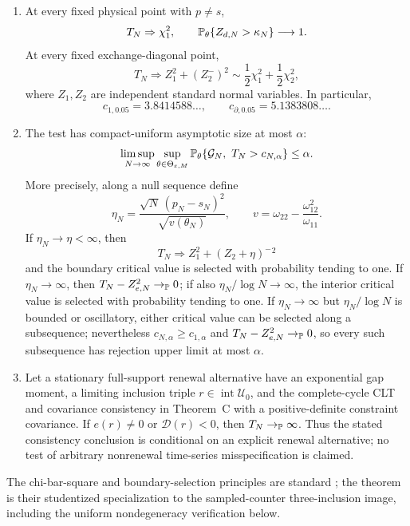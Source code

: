 \begin{theorem}
\begin{enumerate}[label=\textup{(\roman*)}]
\item At every fixed physical point with \(p\ne s\),
\[
T_N\Rightarrow\chi_1^2,
\qquad
\mathbb{P}_\theta\{Z_{d,N}>\kappa_N\}\longrightarrow1.
\]
At every fixed exchange-diagonal point,
\[
T_N\Rightarrow Z_1^2+(Z_2^-)^2
\sim\frac12\chi_1^2+\frac12\chi_2^2,
\]
where \(Z_1,Z_2\) are independent standard normal variables.  In particular,
\[
c_{1,0.05}=3.8414588\ldots,\qquad
c_{\partial,0.05}=5.1383808\ldots .
\]

\item The test has compact-uniform asymptotic size at most \(\alpha\):
\[
\limsup_{N\to\infty}
\sup_{\theta\in\Theta_{\varepsilon,M}}
\mathbb{P}_\theta\{\mathcal G_N,\ T_N>c_{N,\alpha}\}
\le\alpha.
\]
More precisely, along a null sequence define
\[
\eta_N=
\frac{\sqrt N\,(p_N-s_N)^2}
{\sqrt{v(\theta_N)}},
\qquad
v=\omega_{22}-\frac{\omega_{12}^2}{\omega_{11}}.
\]
If \(\eta_N\to\eta<\infty\), then
\[
T_N\Rightarrow Z_1^2+(Z_2+\eta)^-{}^2
\]
and the boundary critical value is selected with probability tending to one.
If \(\eta_N\to\infty\), then
\(T_N-Z_{e,N}^2\to_{\mathbb{P}}0\); if also
\(\eta_N/\log N\to\infty\), the interior critical value is selected with
probability tending to one.  If \(\eta_N\to\infty\) but
\(\eta_N/\log N\) is bounded or oscillatory, either critical value can be
selected along a subsequence; nevertheless
\(c_{N,\alpha}\ge c_{1,\alpha}\) and
\(T_N-Z_{e,N}^2\to_{\mathbb{P}}0\), so every such subsequence has rejection upper
limit at most \(\alpha\).

\item Let a stationary full-support renewal alternative have an exponential
gap moment, a limiting inclusion triple \(r\in\operatorname{int}\mathcal U_0\),
and the complete-cycle CLT and covariance consistency in Theorem~C with a
positive-definite constraint covariance.  If \(e(r)\ne0\) or
\(\mathcal D(r)<0\), then \(T_N\to_{\mathbb{P}}\infty\).  Thus the stated
consistency conclusion is conditional on an explicit renewal alternative;
no test of arbitrary nonrenewal time-series misspecification is claimed.
\end{enumerate}
The chi-bar-square and boundary-selection principles are standard
\cite{Chernoff1954LikelihoodRatio,Shapiro1987MetricProjection,
Andrews2001BoundaryTesting}; the theorem is their studentized specialization
to the sampled-counter three-inclusion image, including the uniform
nondegeneracy verification below.
\end{theorem}

